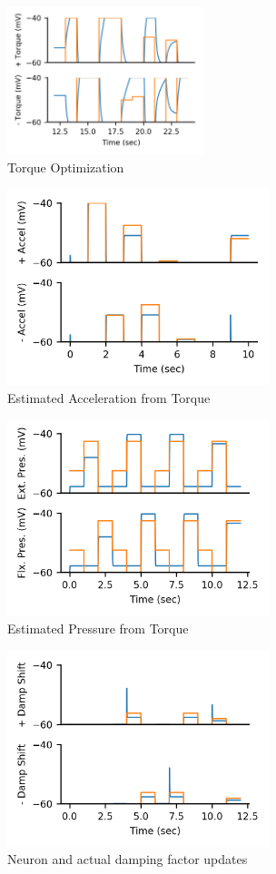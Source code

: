 \documentclass[letterpaper, 10 pt, conference]{IEEEconf} %
\begin{document}
\begin{figure}
\centering
\includegraphics[width=2.25in]{results/TestTorqueOptimization}
\caption{Torque Optimization}
\label{fig:TestTorqueOptimization}
\end{figure}

\begin{figure}
\centering
\includegraphics[height=2.25in]{results/TestT2A}
\caption{Estimated Acceleration from Torque}
\label{fig:TestT2A}
\end{figure}

\begin{figure}
\centering
\includegraphics[height=2.25in]{results/TestT2P}
\caption{Estimated Pressure from Torque}
\label{fig:TestT2P}
\end{figure}

\begin{figure}
\centering
\includegraphics[height=2.25in]{results/TestSystemC}
\caption{Neuron and actual damping factor updates}
\label{fig:TestSystemC}
\end{figure}
\end{document}
